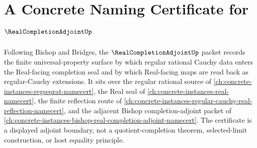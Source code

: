 \chapter{A Concrete Naming Certificate for $\RealCompletionAdjointUp$}
\label{ch:concrete-instances-real-completion-adjoint-namecert}

Following Bishop and Bridges, the $\RealCompletionAdjointUp$ packet records the finite universal-property surface by which regular rational Cauchy data enters the Real-facing completion seal and by which Real-facing maps are read back as regular-Cauchy extensions. It sits over the regular rational source of \autoref{ch:concrete-instances-regseqrat-namecert}, the Real seal of \autoref{ch:concrete-instances-real-namecert}, the finite reflection route of \autoref{ch:concrete-instances-regular-cauchy-real-reflection-namecert}, and the adjacent Bishop completion-adjoint packet of \autoref{ch:concrete-instances-bishop-real-completion-adjoint-namecert}. The certificate is a displayed adjoint boundary, not a quotient-completion theorem, selected-limit construction, or host equality principle.

